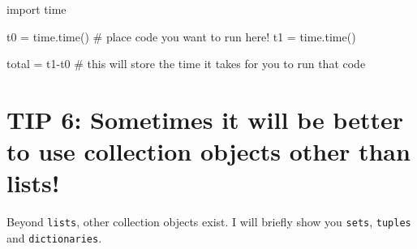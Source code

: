 \documentclass[
  letterpaper,
  DIV=11,
  numbers=noendperiod]{scrartcl}
\newenvironment{Shaded}{\begin{snugshade}}{\end{snugshade}}
\newcommand{\CommentTok}[1]{\textcolor[rgb]{0.37,0.37,0.37}{#1}}
\newcommand{\ImportTok}[1]{\textcolor[rgb]{0.00,0.46,0.62}{#1}}
\newcommand{\NormalTok}[1]{\textcolor[rgb]{0.00,0.23,0.31}{#1}}
\newcommand{\OperatorTok}[1]{\textcolor[rgb]{0.37,0.37,0.37}{#1}}
\begin{document}
\begin{Shaded}
\begin{Highlighting}[]
\ImportTok{import}\NormalTok{ time}

\NormalTok{t0 }\OperatorTok{=}\NormalTok{ time.time()}
\CommentTok{\# place code you want to run here!}
\NormalTok{t1 }\OperatorTok{=}\NormalTok{ time.time()}

\NormalTok{total }\OperatorTok{=}\NormalTok{ t1}\OperatorTok{{-}}\NormalTok{t0 }\CommentTok{\# this will store the time it takes for you to run that code}
\end{Highlighting}
\end{Shaded}

\section{TIP 6: Sometimes it will be better to use collection objects
other than
lists!}\label{tip-6-sometimes-it-will-be-better-to-use-collection-objects-other-than-lists}

Beyond \texttt{lists}, other collection objects exist. I will briefly
show you \texttt{sets}, \texttt{tuples} and \texttt{dictionaries}.
\end{document}
